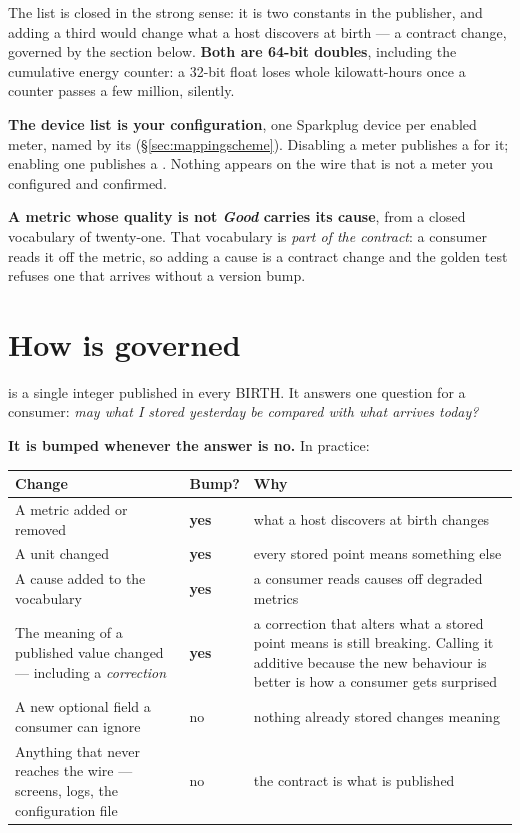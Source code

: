 The list is closed in the strong sense: it is two constants in the publisher, and adding a
third would change what a host discovers at birth --- a contract change, governed by the
section below. \textbf{Both are 64-bit doubles}, including the cumulative energy counter: a
32-bit float loses whole kilowatt-hours once a counter passes a few million, silently.

\textbf{The device list is your configuration}, one Sparkplug device per enabled meter, named
by its  (\S\ref{sec:mappingscheme}). Disabling a meter publishes a  for it;
enabling one publishes a . Nothing appears on the wire that is not a meter you
configured and confirmed.

\begin{note}
\textbf{A metric whose quality is not \emph{Good} carries its cause}, from a closed vocabulary
of twenty-one. That vocabulary is \emph{part of the contract}: a consumer reads it off the
metric, so adding a cause is a contract change and the golden test refuses one that arrives
without a version bump.
\end{note}

\section{How  is governed}
\label{sec:contractgovernance}

 is a single integer published in every BIRTH. It answers one question
for a consumer: \emph{may what I stored yesterday be compared with what arrives today?}

\textbf{It is bumped whenever the answer is no.} In practice:

\begin{center}
\begin{tabular}{@{}p{5.6cm} l p{4.6cm}@{}}
\toprule
\textbf{Change} & \textbf{Bump?} & \textbf{Why} \\
\midrule
A metric added or removed & \textbf{yes} & what a host discovers at birth changes \\
A unit changed & \textbf{yes} & every stored point means something else \\
A cause added to the vocabulary & \textbf{yes} & a consumer reads causes off degraded metrics \\
The meaning of a published value changed --- including a \emph{correction} & \textbf{yes} & a
correction that alters what a stored point means is still breaking. Calling it additive
because the new behaviour is better is how a consumer gets surprised \\
A new optional field a consumer can ignore & no & nothing already stored changes meaning \\
Anything that never reaches the wire --- screens, logs, the configuration file & no & the
contract is what is published \\
\bottomrule
\end{tabular}
\end{center}

